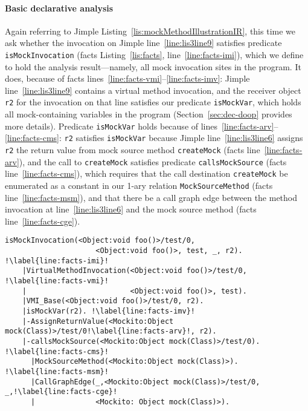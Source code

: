 \paragraph{Basic declarative analysis} Again referring to Jimple Listing~\ref{lis:mockMethodIllustrationIR}, this time we ask whether the invocation on Jimple line~\ref{line:lis3line9} satisfies predicate \texttt{isMockInvocation} (facts Listing~\ref{lis:facts}, line~\ref{line:facts-imi}), which we define to hold the analysis result---namely, all mock invocation sites in the program. It does, because of facts lines~\ref{line:facts-vmi}--\ref{line:facts-imv}: Jimple line~\ref{line:lis3line9} contains a virtual method invocation, and the receiver object \texttt{r2} for the invocation on that line satisfies our predicate \texttt{isMockVar}, which holds all mock-containing variables in the program (Section~\ref{sec:dec-doop} provides more details). Predicate \texttt{isMockVar} holds because of lines~\ref{line:facts-arv}--\ref{line:facts-cms}: \texttt{r2} satisfies \texttt{isMockVar} because Jimple line~\ref{line:lis3line6} assigns \texttt{r2} the return value from mock source method \texttt{createMock} (facts line~\ref{line:facts-arv}), and the call to \texttt{createMock} satisfies predicate \texttt{callsMockSource} (facts line~\ref{line:facts-cms}), which requires that the call destination \texttt{createMock} be enumerated as a constant in our 1-ary relation \texttt{MockSourceMethod} (facts line~\ref{line:facts-msm}), and that there be a call graph edge between the method invocation at line~\ref{line:lis3line6} and the mock source method (facts line~\ref{line:facts-cge}).


\begin{lstlisting}[basicstyle=\ttfamily, caption={Facts about invocation \texttt{r2.foo()} in method \texttt{test}.},
basicstyle=\scriptsize\ttfamily, framesep=4.5mm, framexleftmargin=1.0mm, captionpos=b, label=lis:facts, escapechar=!, morekeywords={@Test}]
	isMockInvocation(<Object:void foo()>/test/0, 
	                 <Object:void foo()>, test, _, r2). !\label{line:facts-imi}!
	|VirtualMethodInvocation(<Object:void foo()>/test/0, !\label{line:facts-vmi}!
	|                        <Object:void foo()>, test).
	|VMI_Base(<Object:void foo()>/test/0, r2).
	|isMockVar(r2). !\label{line:facts-imv}!
	|-AssignReturnValue(<Mockito:Object mock(Class)>/test/0!\label{line:facts-arv}!, r2).
	|-callsMockSource(<Mockito:Object mock(Class)>/test/0). !\label{line:facts-cms}!
	  |MockSourceMethod(<Mockito:Object mock(Class)>). !\label{line:facts-msm}!
	  |CallGraphEdge(_,<Mockito:Object mock(Class)>/test/0, _,!\label{line:facts-cge}!
	  |              <Mockito: Object mock(Class)>). 
\end{lstlisting}


